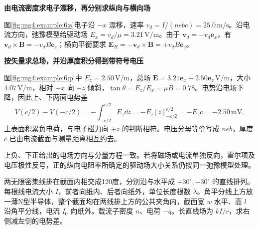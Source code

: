 \begin{solution}\textbf{由电流密度求电子漂移，再分别求纵向与横向场}\par\nobreak
图\ref{fig:mg4:example:6:s}电子沿 $-x$ 漂移，速率 $v_d=I/(nebc)=25.0\,\mathrm{m/s}$。沿电流方向，弛豫模型给驱动场 $E_x=v_d/\mu=3.21\,\mathrm{V/m}$。由于 $\bm v_d=-v_d\bm e_x$，有 $\bm v_d\times\bm B=-v_dB\bm e_z$；横向平衡要求 $\bm E_H=-\bm v_d\times\bm B=+v_dB\bm e_z$。



\par\medskip{}\noindent\textbf{按矢量求总场，并沿厚度积分得到带符号电压}\par\nobreak
图\ref{fig:mg4:example:6:p}中 $E_z=2.50\,\mathrm{V/m}$，总场 $\bm E=3.21\bm e_x+2.50\bm e_z\,\mathrm{V/m}$，大小 $4.07\,\mathrm{V/m}$，相对 $+x$ 向 $+z$ 倾斜，$\tan\theta=E_z/E_x=\mu B=0.78$。电势沿电场下降，因此上、下两面电势差
\[
V(c/2)-V(-c/2)=-\int_{-c/2}^{c/2}E_z\dd z
=-E_z[z]_{-c/2}^{c/2}=-E_zc=-2.50\,\mathrm{mV}.
\]
上表面积累负电荷，与电子磁力向 $+z$ 的判断相符。电压分母等价写成 $neb$，厚度 $c$ 已由电流截面与测量距离相互约去。

上负、下正给出的电场方向与分量方程一致。若将磁场或电流单独反向，霍尔项及电压极性反号，正的纵向电阻率所确定的驱动场大小关系仍按同一弛豫模型处理。\end{solution}
\begin{question}\begin{example}[交叉导线排产生的霍尔电压]\label{mg4:example:7}
两无限密集线排在截面内相交成120度，分别沿与水平成 $+30^\circ,-30^\circ$ 的直线排列。每根线电流大小 $I$，前者向纸内、后者向纸外，单位长度根数 $\lambda$。角平分线上方放一薄N型半导体，整个截面均在两线排上方的公共夹角内，截面宽 $w$ 水平、高 $l$ 沿角平分线，电流 $I_0$ 向纸外。载流子密度 $n$、电荷 $-q$。长直线场为 $kI/r$，求右侧减左侧的电势差。
\end{example}
\end{question}
